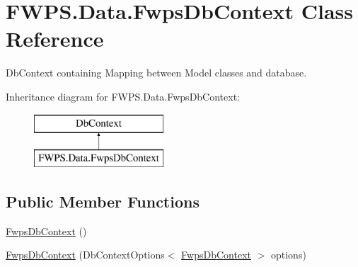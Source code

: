 \hypertarget{class_f_w_p_s_1_1_data_1_1_fwps_db_context}{}\section{F\+W\+P\+S.\+Data.\+Fwps\+Db\+Context Class Reference}
\label{class_f_w_p_s_1_1_data_1_1_fwps_db_context}


Db\+Context containing Mapping between Model classes and database.  


Inheritance diagram for F\+W\+P\+S.\+Data.\+Fwps\+Db\+Context\+:\begin{figure}[H]
\begin{center}
\leavevmode
\includegraphics[height=2.000000cm]{class_f_w_p_s_1_1_data_1_1_fwps_db_context}
\end{center}
\end{figure}
\subsection*{Public Member Functions}
\begin{DoxyCompactItemize}
\item 
\mbox{\hyperlink{class_f_w_p_s_1_1_data_1_1_fwps_db_context_a1add08e0df79e8bfd3c4ca582159cb11}{Fwps\+Db\+Context}} ()
\item 
\mbox{\hyperlink{class_f_w_p_s_1_1_data_1_1_fwps_db_context_a4991b27c8bd3c600570e95558efc574e}{Fwps\+Db\+Context}} (Db\+Context\+Options$<$ \mbox{\hyperlink{class_f_w_p_s_1_1_data_1_1_fwps_db_context}{Fwps\+Db\+Context}} $>$ options)
\end{DoxyCompactItemize}
